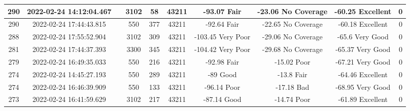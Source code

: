 \begin{longtable*}{|c|c|c|c|c|c|c|c|c|c|}
290&2022-02-24 14:12:04.467&&3102&58&43211& -93.07    Fair        & -23.06    No Coverage & -60.25    Excellent   & 0\\\hline
{}290&2022-02-24 17:44:43.815&&550&377&43211& -92.64    Fair        & -22.65    No Coverage & -60.18    Excellent   & 0\\\hline
{}288&2022-02-24 17:55:52.904&&3102&309&43211& -103.45   Very Poor   & -29.06    No Coverage & -65.6     Very Good   & 0\\\hline
{}281&2022-02-24 17:44:37.393&&3300&345&43211& -104.42   Very Poor   & -29.68    No Coverage & -65.37    Very Good   & 0\\\hline
{}279&2022-02-24 16:49:35.033&&550&216&43211& -92.98    Fair        & -15.02    Poor        & -67.21    Very Good   & 0\\\hline
{}274&2022-02-24 14:45:27.193&&550&289&43211& -89       Good        & -13.8     Fair        & -64.46    Excellent   & 0\\\hline
{}274&2022-02-24 16:46:39.909&&550&133&43211& -96.14    Poor        & -17.18    Bad         & -68.95    Very Good   & 0\\\hline
{}273&2022-02-24 16:41:59.629&&3102&217&43211& -87.14    Good        & -14.74    Poor        & -61.89    Excellent   & 0\\\hline

\end{longtable*}
